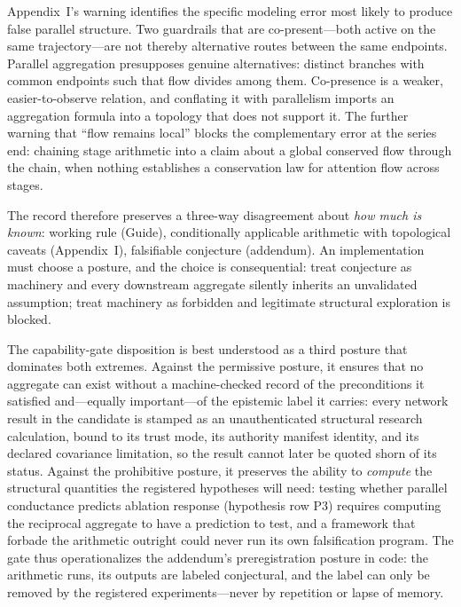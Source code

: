 Appendix~I's warning identifies the specific modeling error most likely to
produce false parallel structure. Two guardrails that are co-present---both
active on the same trajectory---are not thereby alternative routes between
the same endpoints. Parallel aggregation presupposes genuine alternatives:
distinct branches with common endpoints such that flow divides among them.
Co-presence is a weaker, easier-to-observe relation, and conflating it with
parallelism imports an aggregation formula into a topology that does not
support it. The further warning that ``flow remains local'' blocks the
complementary error at the series end: chaining stage arithmetic into a
claim about a global conserved flow through the chain, when nothing
establishes a conservation law for attention flow across stages.

The record therefore preserves a three-way disagreement about \emph{how much
is known}: working rule (Guide), conditionally applicable arithmetic with
topological caveats (Appendix~I), falsifiable conjecture (addendum). An
implementation must choose a posture, and the choice is consequential: treat
conjecture as machinery and every downstream aggregate silently inherits an
unvalidated assumption; treat machinery as forbidden and legitimate
structural exploration is blocked.

The capability-gate disposition is best understood as a third posture that
dominates both extremes. Against the permissive posture, it ensures that no
aggregate can exist without a machine-checked record of the preconditions it
satisfied and---equally important---of the epistemic label it carries:
every network result in the candidate is stamped as an unauthenticated
structural research calculation, bound to its trust mode, its authority
manifest identity, and its declared covariance limitation, so the result
cannot later be quoted shorn of its status. Against the prohibitive posture,
it preserves the ability to \emph{compute} the structural quantities the
registered hypotheses will need: testing whether parallel conductance
predicts ablation response (hypothesis row P3) requires computing the
reciprocal aggregate to have a prediction to test, and a framework that
forbade the arithmetic outright could never run its own falsification
program. The gate thus operationalizes the addendum's preregistration
posture in code: the arithmetic runs, its outputs are labeled conjectural,
and the label can only be removed by the registered experiments---never by
repetition or lapse of memory.


